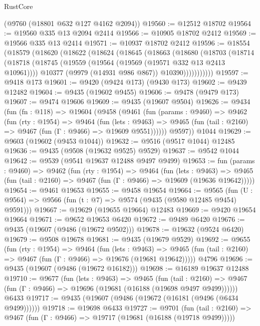 \begin{lexlean}{RustCore}
\begin{coremodule}
    (@9760 (@18801 @632 @127 @4162 @2094))
@19560 := @12512 @18702
@19564 := @19560 @335 @13 @2094 @2414
@19566 := @10905 @18702 @2412
@19569 := @19566 @335 @13 @2414
@19571 := @10937 @18702 @2412
@19596 := @18554
    (@18579
      (@18620
        (@18622
          (@18624
            (@18645
              (@18663
                (@18680
                  (@18703
                    (@18714
                      (@18718
                        (@18745
                          (@19559 (@19564 (@19569 (@19571 @332 @13 @2413 @10961))))
                          @10377
                          (@9979 (@14931 @986 @867))
                          @10390)))))))))))
@19597 := @9418 @173
@19601 := @9420 (@9424 @173) (@9430 @173)
@19602 := @9439 @12482
@19604 := @9435 (@19602 @9455)
@19606 := @9478 (@9479 @173)
@19607 := @9474 @19606
@19609 := @9435 (@19607 @9504)
@19626 := @9434
    (fun (fn : @118) =>
    @19604
      (@9458
        (@9461
          (fun (params : @9460) =>
          @9462
            (fun (rty : @1954) =>
            @9464
              (fun (lets : @9463) =>
              @9465 (fun (tail : @2160) => @9467 (fun (Γ : @9466) => @19609 @9551))))))
        @9597))
    @1044
@19629 := @9603 (@19602 (@9453 @1044))
@19632 := @9516 (@9517 @1044) @12485
@19636 := @9435 (@9508 (@19632 @9525) @9529)
@19637 := @9542 @1044
@19642 := @9539 (@9541 @19637 @12488 @9497 @9499)
@19653 := fun (params : @9460) =>
  @9462
    (fun (rty : @1954) =>
    @9464
      (fun (lets : @9463) =>
      @9465 (fun (tail : @2160) => @9467 (fun (Γ : @9466) => @19609 (@19636 @19642)))))
@19654 := @9461 @19653
@19655 := @9458 @19654
@19664 := @9565
    (fun (U : @9564) => @9566 (fun (t : @7) => @9574 (@9435 (@9580 @12485 @9454) @9591)))
@19667 := @19629 (@19655 @19664) @12483
@19669 := @9420 @19654 @19664
@19671 := @9652 @19653 @6420
@19672 := @9489 @6420
@19676 := @9435 (@19607 (@9486 (@19672 @9502)))
@19678 := @19632 (@9524 @6420)
@19679 := @9508 @19678
@19681 := @9435 (@19679 @9529)
@19692 := @9655
    (fun (rty : @1954) =>
    @9464
      (fun (lets : @9463) =>
      @9465 (fun (tail : @2160) => @9467 (fun (Γ : @9466) => @19676 (@19681 @19642)))))
    @4796
@19696 := @9435 (@19607 (@9486 (@19672 @16182)))
@19698 := @16189 @19637 @12488
@19710 := @9677
    (fun (lets : @9463) =>
    @9465
      (fun (tail : @2160) =>
      @9467 (fun (Γ : @9466) => @19696 (@19681 (@16188 (@19698 @9497 @9499))))))
    @6433
@19717 := @9435 (@19607 (@9486 (@19672 (@16181 (@9496 (@6434 @9499))))))
@19718 := @19698 @6433
@19727 := @9701
    (fun (tail : @2160) => @9467 (fun (Γ : @9466) => @19717 (@19681 (@16188 (@19718 @9499)))))

\end{coremodule}
\end{lexlean}
